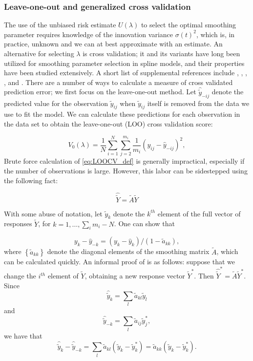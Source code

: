 \documentclass[12pt]{article}
\newcommand{\tildeY}{\tilde{Y}}
\newcommand{\tildey}{\tilde{y}}
\newcommand{\tildeA}{\tilde{A}}
\theoremstyle{definition}
\begin{document}
\subsubsection{Leave-one-out and generalized cross validation}
The use of the unbiased risk estimate $U\left( \lambda \right)$ to select the optimal smoothing parameter requires knowledge of the innovation variance $\sigma\left(t \right)^2$, which is, in practice, unknown and we can at best approximate with an estimate. An alternative for selecting $\lambda$ is cross validation; it and its variants have long been utilized for smoothing parameter selection in spline models, and their properties have been studied extensively. A short list of supplemental references include \citet{craven1978smoothing}, \citet{wahba1985comparison}, \citet{hardle1988far}, \citet{hardle1992applied}, and \citet{wahba1990spline}. There are a number of ways to calculate a measure of cross validated prediction error; we first focus on the leave-one-out method. Let $\hat{\tildey}_{-ij}$ denote the predicted value for the observation $\tildey_{ij}$ when $\tildey_{ij}$ itself is removed from the data we use to fit the model. We can calculate these predictions for each observation in the data set to obtain the leave-one-out (LOO) cross validation score:

\begin{equation} \label{eq:LOOCV}
V_0\left(\lambda\right) = \frac{1}{N} \sum_{i=1}^N \sum_{j=2}^{m_i} \frac{1}{m_i} \left(  y_{ij} - \hat{y}_{-ij}\right)^2, 
\end{equation}
Brute force calculation of \ref{eq:LOOCV_def} is generally impractical, especially if the number of observations is large. However, this labor can be sidestepped using the following fact: 

\begin{equation*}
\widehat{\tildeY} = \tildeA \tildeY
\end{equation*}
\noindent

With some abuse of notation, let $\tildey_{k}$ denote the $k^{th}$ element of the full vector of responses $\tildeY$, for $k = 1, \dots, \sum_i m_i - N$. One can show that 

\begin{equation} \label{eq:LOO_residual}
y_k - \hat{y}_{-k} = \left(y_k - \hat{y}_{k}\right)/\left(1-\tilde{a}_{kk}\right),
\end{equation}
\noindent
where $\left\{\tilde{a}_{kk}\right\}$ denote the diagonal elements of the smoothing matrix $\tildeA$, which can be calculated quickly. An informal proof of \label{eq:LOO_residual} is as follows: suppose that we change the $i^{th}$ element of $\tildeY$, obtaining a new response vector $\tildeY^*$. Then $\widehat{\tildeY}^* = \tildeA \tildeY^*$.  Since 
 \[
 \hat{\tildey}_k = \sum_{l} \tilde{a}_{kl} \tildey_l 
 \]
 \noindent 
 and 
 \[
 \hat{\tildey}_{-k} = \sum_{l} \tilde{a}_{ij} \tildey_j^*,
 \]
 \noindent
 we have that
 \[
 \hat{\tildey}_k - \hat{\tildey}_{-k} = \sum_l \tilde{a}_{kl} \left(\tildey_k - \tildey_k^*\right) = \tilde{a}_{kk} \left(\tildey_k - \tildey_k^*\right).  
\]
\end{document}
